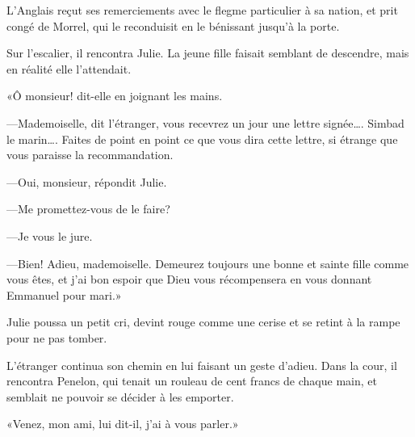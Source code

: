L'Anglais reçut ses remerciements avec le flegme particulier à sa nation, et prit congé de Morrel, qui le reconduisit en le bénissant jusqu'à la porte.

Sur l'escalier, il rencontra Julie. La jeune fille faisait semblant de descendre, mais en réalité elle l'attendait.

«Ô monsieur! dit-elle en joignant les mains.

—Mademoiselle, dit l'étranger, vous recevrez un jour une lettre signée\dots. Simbad le marin\dots. Faites de point en point ce que vous dira cette lettre, si étrange que vous paraisse la recommandation.

—Oui, monsieur, répondit Julie.

—Me promettez-vous de le faire?

—Je vous le jure.

—Bien! Adieu, mademoiselle. Demeurez toujours une bonne et sainte fille comme vous êtes, et j'ai bon espoir que Dieu vous récompensera en vous donnant Emmanuel pour mari.»

Julie poussa un petit cri, devint rouge comme une cerise et se retint à la rampe pour ne pas tomber.

L'étranger continua son chemin en lui faisant un geste d'adieu. Dans la cour, il rencontra Penelon, qui tenait un rouleau de cent francs de chaque main, et semblait ne pouvoir se décider à les emporter.

«Venez, mon ami, lui dit-il, j'ai à vous parler.»




